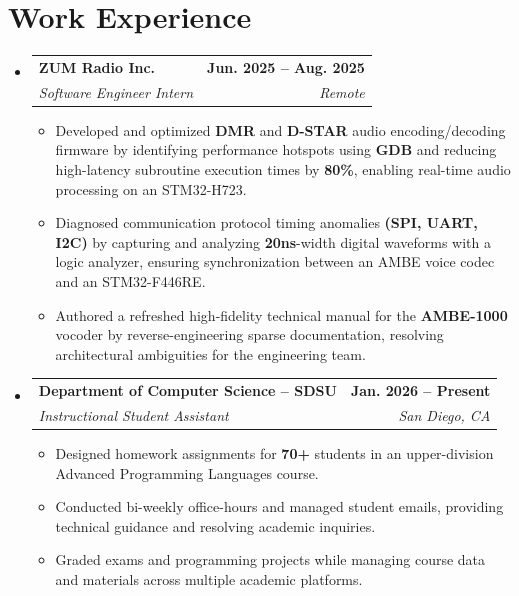 \documentclass[10pt,letterpaper]{article}
\makeatletter
\newcommand{\resumeItem}[1]{\item\small{#1}}
\newcommand{\resumeHeading}[4]{
  \vspace{2pt}\item
    \begin{tabular*}{0.97\textwidth}[t]{l@{\extracolsep{\fill}}r}
      \textbf{#1} & \textbf{\small #2} \\
      \textit{\small#3} & \textit{\small #4} \\
    \end{tabular*}\vspace{-5pt}
}
\makeatother
\begin{document}
\section{Work Experience}
\begin{itemize}[leftmargin=0.15in, label={}]
    \resumeHeading
      {ZUM Radio Inc.}{\textbf{Jun. 2025 -- Aug. 2025}}
      {Software Engineer Intern}{Remote}
      \begin{itemize}[leftmargin=0.2in, label=$\bullet$]
        \resumeItem{Developed and optimized \textbf{DMR} and \textbf{D-STAR} audio encoding/decoding firmware by identifying performance hotspots using \textbf{GDB} and reducing high-latency subroutine execution times by \textbf{80\%}, enabling real-time audio processing on an STM32-H723.}
        \resumeItem{Diagnosed communication protocol timing anomalies \textbf{(SPI, UART, I2C)} by capturing and analyzing \textbf{20ns}-width digital waveforms with a logic analyzer, ensuring synchronization between an AMBE voice codec and an STM32-F446RE.}
        \resumeItem{Authored a refreshed high-fidelity technical manual for the \textbf{AMBE-1000} vocoder by reverse-engineering sparse documentation, resolving architectural ambiguities for the engineering team.}
      \end{itemize}

    \resumeHeading
      {Department of Computer Science -- SDSU}{\textbf{Jan. 2026 -- Present}}
      {Instructional Student Assistant}{San Diego, CA}
      \begin{itemize}[leftmargin=0.2in, label=$\bullet$]
        \resumeItem{Designed homework assignments for \textbf{70+} students in an upper-division Advanced Programming Languages course.}
        \resumeItem{Conducted bi-weekly office-hours and managed student emails, providing technical guidance and resolving academic inquiries.}
        \resumeItem{Graded exams and programming projects while managing course data and materials across multiple academic platforms.}
      \end{itemize}
\end{itemize}

\end{document}
